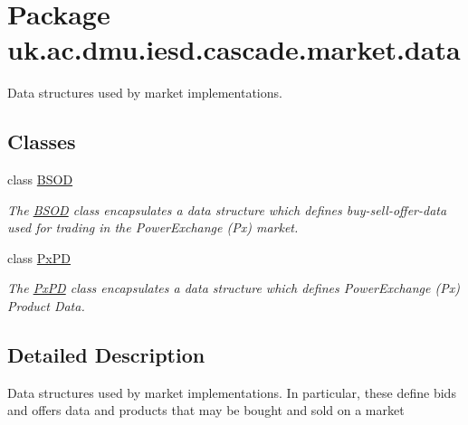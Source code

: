 \hypertarget{namespaceuk_1_1ac_1_1dmu_1_1iesd_1_1cascade_1_1market_1_1data}{\section{Package uk.\-ac.\-dmu.\-iesd.\-cascade.\-market.\-data}
\label{namespaceuk_1_1ac_1_1dmu_1_1iesd_1_1cascade_1_1market_1_1data}
}


Data structures used by market implementations.  


\subsection*{Classes}
\begin{DoxyCompactItemize}
\item 
class \hyperlink{classuk_1_1ac_1_1dmu_1_1iesd_1_1cascade_1_1market_1_1data_1_1_b_s_o_d}{B\-S\-O\-D}
\begin{DoxyCompactList}\small\item\em The {\itshape \hyperlink{classuk_1_1ac_1_1dmu_1_1iesd_1_1cascade_1_1market_1_1data_1_1_b_s_o_d}{B\-S\-O\-D}} class encapsulates a data structure which defines buy-\/sell-\/offer-\/data used for trading in the {\itshape Power\-Exchange} (Px) market. \end{DoxyCompactList}\item 
class \hyperlink{classuk_1_1ac_1_1dmu_1_1iesd_1_1cascade_1_1market_1_1data_1_1_px_p_d}{Px\-P\-D}
\begin{DoxyCompactList}\small\item\em The {\itshape \hyperlink{classuk_1_1ac_1_1dmu_1_1iesd_1_1cascade_1_1market_1_1data_1_1_px_p_d}{Px\-P\-D}} class encapsulates a data structure which defines {\itshape Power\-Exchange} (Px) Product Data. \end{DoxyCompactList}\end{DoxyCompactItemize}


\subsection{Detailed Description}
Data structures used by market implementations. In particular, these define bids and offers data and products that may be bought and sold on a market 